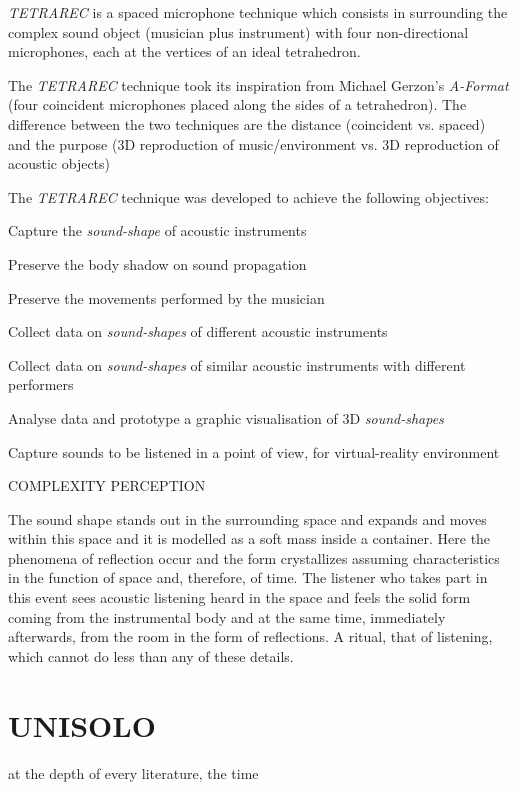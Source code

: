 \documentclass[
	12pt,
	a4paper,
	twocolumn
	]{article}
\begin{document}
\emph{TETRAREC} is a spaced microphone technique which consists in surrounding the complex sound object (musician plus instrument) with four non-directional microphones, each at the vertices of an ideal tetrahedron.

The \emph{TETRAREC} technique took its inspiration from Michael Gerzon's \emph{A-Format} (four coincident microphones placed along the sides of a tetrahedron). The difference between the two techniques are the distance (coincident vs. spaced) and the purpose (3D reproduction of music/environment vs. 3D reproduction of acoustic objects)

The \emph{TETRAREC} technique was developed to achieve the following objectives:

\begin{compactitem}
\item Capture the \emph{sound-shape} of acoustic instruments
\item Preserve the body shadow on sound propagation
\item Preserve the movements performed by the musician
\item Collect data on \emph{sound-shapes} of different acoustic instruments
\item Collect data on \emph{sound-shapes} of similar acoustic instruments with different performers
\item Analyse data and prototype a graphic visualisation of 3D \emph{sound-shapes}
\item Capture sounds to be listened in a point of view, for virtual-reality environment
\end{compactitem}

COMPLEXITY PERCEPTION

The sound shape stands out in the surrounding space and expands and moves within this space and it is modelled as a soft mass inside a container. Here the phenomena of reflection occur and the form crystallizes assuming characteristics in the function of space and, therefore, of time. The listener who takes part in this event sees acoustic listening heard in the space and feels the solid form coming from the instrumental body and at the same time, immediately afterwards, from the room in the form of reflections. A ritual, that of listening, which cannot do less than any of these details.

\clearpage
\section*{UNISOLO}
at the depth of every literature, the time
\end{document}
